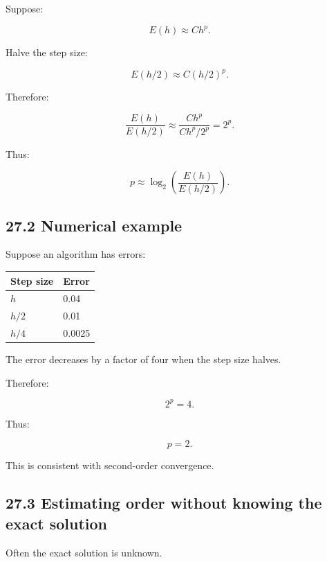 \hypertarget{02-foundations-ii-ch029-step-size-refinement}{}

Suppose:

\[ E(h)\approx Ch^p. \]

Halve the step size:

\[ E(h/2)\approx C(h/2)^p. \]

Therefore:

\[ \frac{E(h)}{E(h/2)} \approx \frac{Ch^p}{Ch^p/2^p} =2^p. \]

Thus:

\[ \boxed{ p\approx \log_2\left( \frac{E(h)}{E(h/2)} \right) }. \]

\subsection{27.2 Numerical example}\label{02-foundations-ii-ch029-numerical-example}

\hypertarget{02-foundations-ii-ch029-numerical-example}{}

Suppose an algorithm has errors:

{\def\LTcaptype{none} %
\begin{longtable}[]{@{}ll@{}}
\toprule\noalign{}
Step size & Error \\
\midrule\noalign{}
\endhead
\bottomrule\noalign{}
\endlastfoot
\(h\) & 0.04 \\
\(h/2\) & 0.01 \\
\(h/4\) & 0.0025 \\
\end{longtable}
}

The error decreases by a factor of four when the step size halves.

Therefore:

\[ 2^p=4. \]

Thus:

\[ \boxed{p=2}. \]

This is consistent with second-order convergence.

\subsection{27.3 Estimating order without knowing the exact solution}\label{02-foundations-ii-ch029-estimating-order-without-knowing-the-exact-solution}

\hypertarget{02-foundations-ii-ch029-estimating-order-without-knowing-the-exact-solution}{}

Often the exact solution is unknown.

